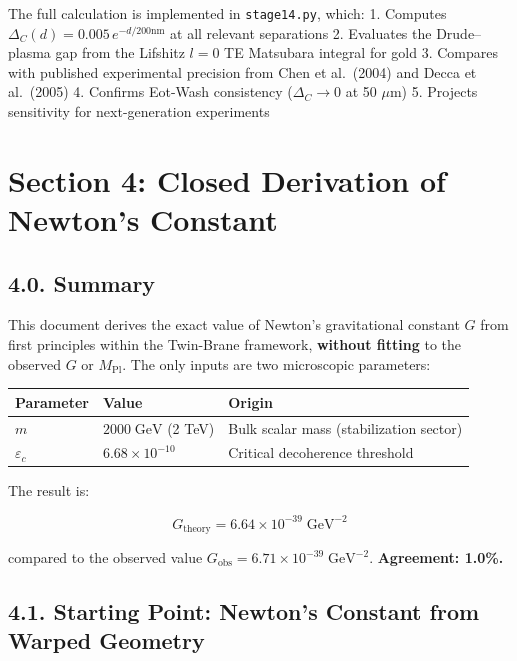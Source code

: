 \documentclass[
  11pt,
]{article}
\begin{document}
The full calculation is implemented in \texttt{stage14.py}, which: 1.
Computes \(\Delta_C(d) = 0.005 \, e^{-d/200\text{nm}}\) at all relevant
separations 2. Evaluates the Drude--plasma gap from the Lifshitz \(l=0\)
TE Matsubara integral for gold 3. Compares with published experimental
precision from Chen et al.~(2004) and Decca et al.~(2005) 4. Confirms
Eot-Wash consistency (\(\Delta_C \to 0\) at 50 \(\mu\)m) 5. Projects
sensitivity for next-generation experiments

\bigskip

\hypertarget{section-4-closed-derivation-of-newtons-constant}{%
\section{Section 4: Closed Derivation of Newton's
Constant}\label{section-4-closed-derivation-of-newtons-constant}}

\hypertarget{summary}{%
\subsection{4.0. Summary}\label{summary}}

This document derives the exact value of Newton's gravitational constant
\(G\) from first principles within the Twin-Brane framework,
\textbf{without fitting} to the observed \(G\) or \(M_{\text{Pl}}\). The
only inputs are two microscopic parameters:

\begin{longtable}[]{@{}lll@{}}
\toprule
Parameter & Value & Origin\tabularnewline
\midrule
\endhead
\(m\) & \(2000\;\text{GeV}\) (2 TeV) & Bulk scalar mass (stabilization
sector)\tabularnewline
\(\varepsilon_c\) & \(6.68 \times 10^{-10}\) & Critical decoherence
threshold\tabularnewline
\bottomrule
\end{longtable}

The result is:

\[\boxed{G_{\text{theory}} = 6.64 \times 10^{-39}\;\text{GeV}^{-2}} \tag{172}\]

compared to the observed value
\(G_{\text{obs}} = 6.71 \times 10^{-39}\;\text{GeV}^{-2}\).
\textbf{Agreement: 1.0\%.}

\bigskip

\hypertarget{starting-point-newtons-constant-from-warped-geometry}{%
\subsection{4.1. Starting Point: Newton's Constant from Warped
Geometry}\label{starting-point-newtons-constant-from-warped-geometry}}
\end{document}
